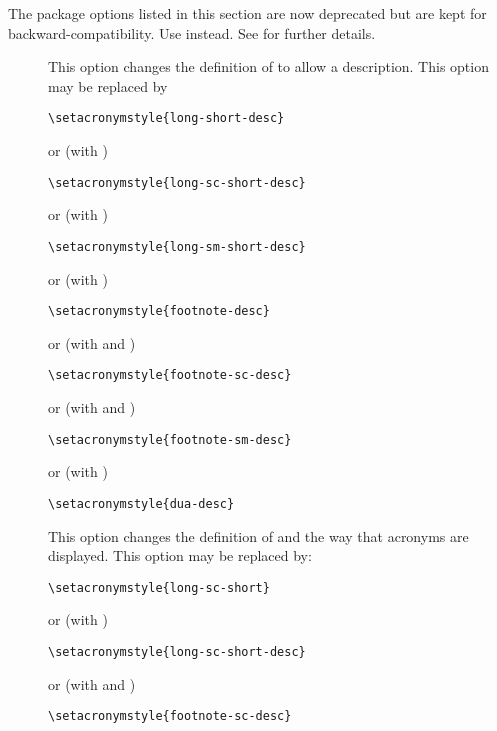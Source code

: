 \documentclass[report,inlinetitle]{nlctdoc}
\begin{document}
The package options listed in this section are now deprecated but
are kept for backward-compatibility. Use 
instead. See  for further details.

\begin{description}
\item[] This option changes the definition of
 to allow a description.
This option may be replaced by
\begin{verbatim}
\setacronymstyle{long-short-desc}
\end{verbatim}
or (with )
\begin{verbatim}
\setacronymstyle{long-sc-short-desc}
\end{verbatim}
or (with )
\begin{verbatim}
\setacronymstyle{long-sm-short-desc}
\end{verbatim}
or (with )
\begin{verbatim}
\setacronymstyle{footnote-desc}
\end{verbatim}
or (with  and )
\begin{verbatim}
\setacronymstyle{footnote-sc-desc}
\end{verbatim}
or (with  and )
\begin{verbatim}
\setacronymstyle{footnote-sm-desc}
\end{verbatim}
or (with )
\begin{verbatim}
\setacronymstyle{dua-desc}
\end{verbatim}

\item[] This option changes the definition of
 and the way that acronyms are displayed. 
This option may be replaced by:
\begin{verbatim}
\setacronymstyle{long-sc-short}
\end{verbatim}
or (with )
\begin{verbatim}
\setacronymstyle{long-sc-short-desc}
\end{verbatim}
or (with  and )
\begin{verbatim}
\setacronymstyle{footnote-sc-desc}
\end{verbatim}


\end{description}
\end{document}
